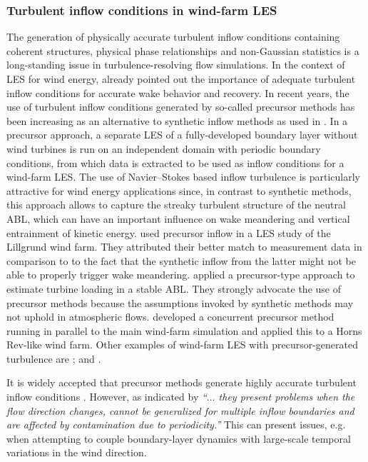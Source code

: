 \subsubsection{Turbulent inflow conditions in wind-farm LES}
The generation of physically accurate turbulent inflow conditions containing coherent structures, physical phase relationships and non-Gaussian statistics is a long-standing issue in turbulence-resolving flow simulations. In the context of LES for wind energy, \cite{troldborg2007actuator} already pointed out the importance of adequate turbulent inflow conditions for accurate wake behavior and recovery. In recent years, the use of turbulent inflow conditions generated by so-called precursor methods has been increasing \citep{keating2004priori, tabor2010inlet} as an alternative to synthetic inflow methods as used in \cite{ivanell2009numerical}. In a precursor approach, a separate LES of a fully-developed boundary layer without wind turbines is run on an independent domain with periodic boundary conditions, from which data is extracted to be used as inflow conditions for a wind-farm LES. The use of Navier--Stokes based inflow turbulence is particularly attractive for wind energy applications since, in contrast to synthetic methods, this approach allows to capture the streaky turbulent structure of the neutral ABL, which can have an important influence on wake meandering and vertical entrainment of kinetic energy. \cite{churchfield2012large} used precursor inflow in a LES study of the Lillgrund wind farm. They attributed their better match to measurement data in comparison to \cite{ivanell2009numerical} to the fact that the synthetic inflow from the latter might not be able to properly trigger wake meandering. 
\cite{park2014large} applied a precursor-type approach to estimate turbine loading in a stable ABL. They strongly advocate the use of precursor methods because the assumptions invoked by synthetic methods may not uphold in atmospheric flows. \cite{stevens2014concurrent} developed a concurrent precursor method running in parallel to the main wind-farm simulation and applied this to a Horns Rev-like wind farm. Other examples of wind-farm LES with precursor-generated turbulence are \cite{porte2011large,archer2013quantifying,wu2013simulation,stevens2014large,abkar2016wake}; and \cite{stevens2016dependence}.

It is widely accepted that precursor methods generate highly accurate turbulent inflow conditions \citep{keating2004priori,tabor2010inlet,wu2017inflow}. However, as indicated by \cite{esparza2014bridging} \emph{``$\dots$ they present problems when the flow direction changes, cannot be generalized for multiple inflow boundaries and are affected by contamination due to periodicity.''} This can present issues, e.g. when attempting to couple boundary-layer dynamics with large-scale temporal variations in the wind direction. 


